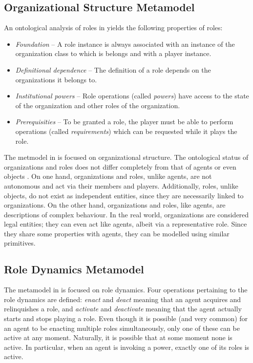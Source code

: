 \subsection*{Organizational Structure Metamodel}

An ontological analysis of roles in \cite{Boella04} yields the following properties of roles:
\begin{itemize}
	\item \textit{Foundation} -- A role instance is always associated with an instance of the organization class to which is belongs and with a player instance.
	\item \textit{Definitional dependence} -- The definition of a role depends on the organizations it belongs to.
	\item \textit{Institutional powers} -- Role operations (called \textit{powers}) have access to the state of the organization and other roles of the organization.
	\item \textit{Prerequisities} -- To be granted a role, the player must be able to perform operations (called \textit{requirements}) which can be requested while it plays the role.
\end{itemize}


The metmodel in \cite{Boella04} is focused on organizational structure.
The ontological status of organizations and roles does not differ completely from that of agents or even objects \cite{Boella04}.
On one hand, organizations and roles, unlike agents, are not autonomous and act via their members and players.
Additionally, roles, unlike objects, do not exist as independent entities, since they are necessarily linked to organizations.
On the other hand, organizations and roles, like agents, are descriptions of complex behaviour.
In the real world, organizations are considered legal entities; they can even act like agents, albeit via a representative role.
Since they share some properties with agents, they can be modelled using similar primitives.

\subsection*{Role Dynamics Metamodel}

The metamodel in \cite{Dastani04} is focused on role dynamics.
Four operations pertaining to the role dynamics are defined: \textit{enact} and \textit{deact} meaning that an agent acquires and relinquishes a role, and \textit{activate} and \textit{deactivate} meaning that the agent actually starts and stops playing a role.
Even though it is possible (and very common) for an agent to be enacting multiple roles simultaneously, only one of these can be active at any moment.
Naturally, it is possible that at some moment none is active.
In particular, when an agent is invoking a power, exactly one of its roles is active.

